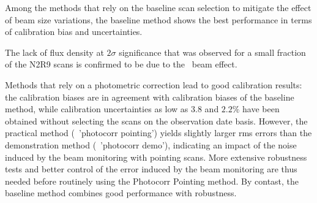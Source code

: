 Among the methods that rely on the baseline scan selection to
mitigate the effect of beam size variations, the baseline method shows
the best performance in terms of calibration bias and uncertainties.

The lack of flux density at $2\sigma$ significance that was observed
for a small fraction of the N2R9 scans is confirmed to be due to the
\afternoon\ beam effect.

Methods that rely on a photometric correction lead to good calibration
results: the calibration biases are in agreement with calibration
biases of the baseline method, while calibration uncertainties as low
as $3.8$ and $2.2\%$ have been obtained without selecting the scans on
the observation date basis. However, the practical method
(\aka\ 'photocorr pointing') yields slightly larger rms errors than
the demonstration method (\aka\ 'photocorr demo'), indicating an
impact of the noise induced by the beam monitoring with pointing
scans. More extensive robustness tests and better control of the error
induced by the beam monitoring are thus needed before routinely using
the Photocorr Pointing method.
By contast, the baseline method combines good performance with robustness.    








